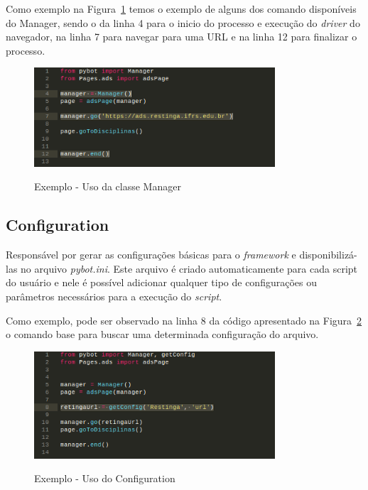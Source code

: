         Como exemplo na Figura~\ref{fig:manager} temos o exemplo de alguns dos comando disponíveis do Manager, sendo o da linha 4 para o inicio do processo
        e execução do \emph{driver} do navegador, na linha 7 para navegar para uma URL e na linha 12 para finalizar o processo.

        \begin{figure}[H]
            \vspace*{0,3cm}
            \centering
            \caption{Exemplo - Uso da classe Manager}
            \includegraphics[width=0.8\textwidth]{./04-figuras/manager}
            \label{fig:manager}
        \end{figure}
        \vspace*{-0,9cm}
        {\raggedright {}}

        \subsection{Configuration}
        Responsável por gerar as configurações básicas para o \emph{framework} e disponibilizá-las no arquivo \emph{pybot.ini}.
        Este arquivo é criado automaticamente para cada script do usuário e nele é possível adicionar qualquer tipo de configurações ou parâmetros
        necessários para a execução do \emph{script}.

        Como exemplo, pode ser observado na linha 8 da código apresentado na Figura~\ref{fig:config} o comando base para buscar uma determinada configuração do arquivo.

        \begin{figure}[H]
            \vspace*{0,3cm}
            \centering
            \caption{Exemplo - Uso do Configuration}
            \includegraphics[width=0.8\textwidth]{./04-figuras/config}
            \label{fig:config}
        \end{figure}
        \vspace*{-0,9cm}
        {\raggedright {}}

